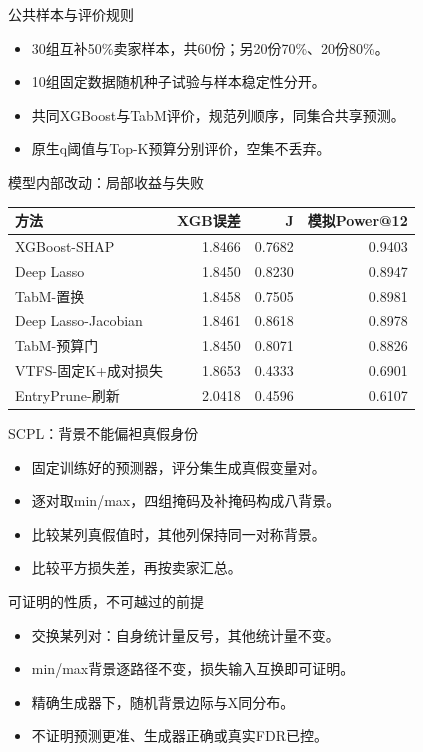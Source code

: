\documentclass[aspectratio=169]{beamer}
\begin{document}
\begin{frame}{公共样本与评价规则}
\begin{itemize}
\item 30组互补50\%卖家样本，共60份；另20份70\%、20份80\%。
\item 10组固定数据随机种子试验与样本稳定性分开。
\item 共同XGBoost与TabM评价，规范列顺序，同集合共享预测。
\item 原生q阈值与Top-K预算分别评价，空集不丢弃。
\end{itemize}
\end{frame}
\begin{frame}{模型内部改动：局部收益与失败}
\footnotesize\centering \begin{tabular}{lrrr}
\toprule
方法 & XGB误差 & J & 模拟Power@12\\\midrule
XGBoost-SHAP & 1.8466 & 0.7682 & 0.9403\\
Deep Lasso & 1.8450 & 0.8230 & 0.8947\\
TabM-置换 & 1.8458 & 0.7505 & 0.8981\\
Deep Lasso-Jacobian & 1.8461 & 0.8618 & 0.8978\\
TabM-预算门 & 1.8450 & 0.8071 & 0.8826\\
VTFS-固定K+成对损失 & 1.8653 & 0.4333 & 0.6901\\
EntryPrune-刷新 & 2.0418 & 0.4596 & 0.6107\\
\bottomrule
\end{tabular}
\end{frame}
\begin{frame}{SCPL：背景不能偏袒真假身份}
\begin{itemize}
\item 固定训练好的预测器，评分集生成真假变量对。
\item 逐对取min/max，四组掩码及补掩码构成八背景。
\item 比较某列真假值时，其他列保持同一对称背景。
\item 比较平方损失差，再按卖家汇总。
\end{itemize}
\end{frame}
\begin{frame}{可证明的性质，不可越过的前提}
\begin{itemize}
\item 交换某列对：自身统计量反号，其他统计量不变。
\item min/max背景逐路径不变，损失输入互换即可证明。
\item 精确生成器下，随机背景边际与X同分布。
\item 不证明预测更准、生成器正确或真实FDR已控。
\end{itemize}
\end{frame}
\end{document}
